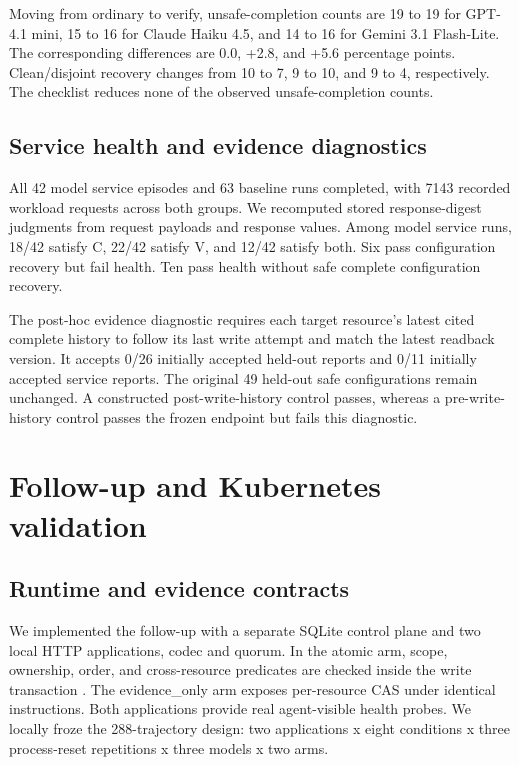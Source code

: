 \documentclass[conference,10pt]{IEEEtran}
\begin{document}
Moving from ordinary to verify, unsafe-completion counts are 19 to 19 for GPT-4.1 mini, 15 to 16 for Claude Haiku 4.5, and 14 to 16 for Gemini 3.1 Flash-Lite. The corresponding differences are 0.0, +2.8, and +5.6 percentage points. Clean/disjoint recovery changes from 10 to 7, 9 to 10, and 9 to 4, respectively. The checklist reduces none of the observed unsafe-completion counts.

\subsection{Service health and evidence diagnostics}

All 42 model service episodes and 63 baseline runs completed, with 7143 recorded workload requests across both groups. We recomputed stored response-digest judgments from request payloads and response values. Among model service runs, 18/42 satisfy C, 22/42 satisfy V, and 12/42 satisfy both. Six pass configuration recovery but fail health. Ten pass health without safe complete configuration recovery.

The post-hoc evidence diagnostic requires each target resource's latest cited complete history to follow its last write attempt and match the latest readback version. It accepts 0/26 initially accepted held-out reports and 0/11 initially accepted service reports. The original 49 held-out safe configurations remain unchanged. A constructed post-write-history control passes, whereas a pre-write-history control passes the frozen endpoint but fails this diagnostic.

\section{Follow-up and Kubernetes validation}

\subsection{Runtime and evidence contracts}

We implemented the follow-up with a separate SQLite control plane and two local HTTP applications, codec and quorum. In the atomic arm, scope, ownership, order, and cross-resource predicates are checked inside the write transaction \cite{ref12}. The evidence\_\allowbreak{}only arm exposes per-resource CAS under identical instructions. Both applications provide real agent-visible health probes. We locally froze the 288-trajectory design: two applications x eight conditions x three process-reset repetitions x three models x two arms.
\end{document}

